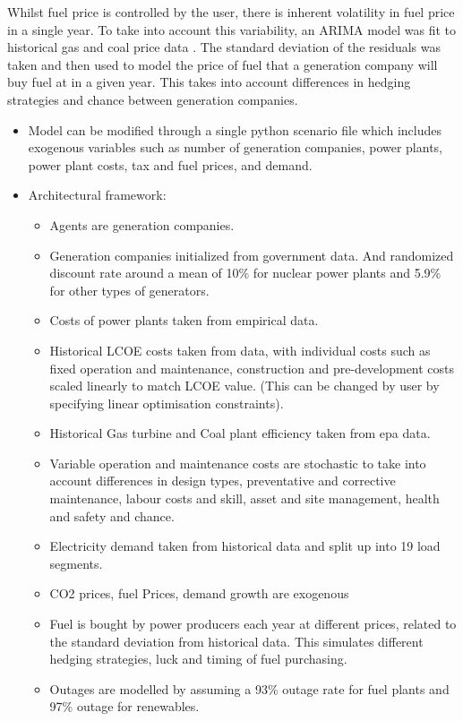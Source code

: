Whilst fuel price is controlled by the user, there is inherent volatility in fuel price in a single year. To take into account this variability, an ARIMA model was fit to historical gas and coal price data \cite{coalprices,gasprices}. The standard deviation of the residuals was taken and then used to model the price of fuel that a generation company will buy fuel at in a given year. This takes into account differences in hedging strategies and chance between generation companies.




\begin{itemize}
	\item Model can be modified through a single python scenario file which includes exogenous variables such as number of generation companies, power plants, power plant costs, tax and fuel prices, and demand.
	\item Architectural framework:
	\begin{itemize}
		\item Agents are generation companies.
		\item Generation companies initialized from government data. And randomized discount rate around a mean of 10\% for nuclear power plants and 5.9\% for other types of generators.
		\item Costs of power plants taken from empirical data. 
		\item Historical LCOE costs taken from data, with individual costs such as fixed operation and maintenance, construction and pre-development costs scaled linearly to match LCOE value. (This can be changed by user by specifying linear optimisation constraints).
		\item Historical Gas turbine and Coal plant efficiency taken from epa data.
		\item Variable operation and maintenance costs are stochastic to take into account differences in design types, preventative and corrective maintenance, labour costs and skill, asset and site management, health and safety and chance.
		\item Electricity demand taken from historical data and split up into 19 load segments.
		\item CO2 prices, fuel Prices, demand growth are exogenous
		\item Fuel is bought by power producers each year at different prices, related to the standard deviation from historical data. This simulates different hedging strategies, luck and timing of fuel purchasing.
		\item Outages are modelled by assuming a 93\% outage rate for fuel plants \cite{Ltd2016} and 97\% outage for renewables. \cite{carroll-j}

\end{itemize}
\end{itemize}
